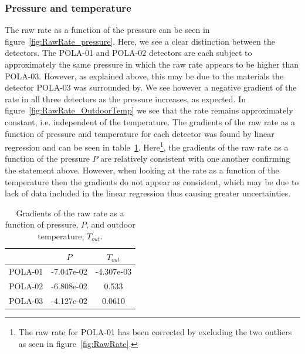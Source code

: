 \documentclass[12pt,a4paper]{amsart}
\begin{document}
\subsubsection{Pressure and temperature}
The raw rate as a function of the pressure can be seen in figure~\ref{fig:RawRate_pressure}. Here, we see a clear distinction between the detectors. The POLA-01 and POLA-02 detectors are each subject to approximately the same pressure in which the raw rate appears to be higher than POLA-03. However, as explained above, this may be due to the materials the detector POLA-03 was surrounded by. We see however a negative gradient of the rate in all three detectors as the pressure increases, as expected. In figure~\ref{fig:RawRate_OutdoorTemp} we see that the rate remains approximately constant, i.e. independent of the temperature. The gradients of the raw rate as a function of pressure and temperature for each detector was found by linear regression and can be seen in table~\ref{tab:rawrate_gradients}. Here\footnote{The raw rate for POLA-01 has been corrected by excluding the two outliers as seen in figure~\ref{fig:RawRate}.}, the gradients of the raw rate as a function of the pressure $P$ are relatively consistent with one another confirming the statement above. However, when looking at the rate as a function of the temperature then the gradients do not appear as consistent, which may be due to lack of data included in the linear regression thus causing greater uncertainties.

\begin{table}[]
\caption{Gradients of the raw rate as a function of pressure, $P$, and outdoor temperature, $T_{out}$.}\label{tab:rawrate_gradients}
\begin{tabular}{c|cc}
\hline\hline
        & $P$        & $T_{out}$  \\ \hline
POLA-01 & -7.047e-02 & -4.307e-03 \\
POLA-02 & -6.808e-02 & 0.533      \\
POLA-03 & -4.127e-02 & 0.0610    \\
\hline \hline
\end{tabular}
\end{table}
\end{document}
